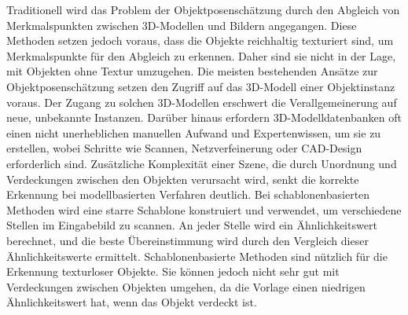 \documentclass[a4paper, 11pt]{article}
\begin{document}
\begin{multicols*}{2}
    Traditionell wird das Problem der Objektposenschätzung durch den Abgleich von Merkmalspunkten zwischen 3D-Modellen und Bildern angegangen. Diese Methoden setzen jedoch voraus, dass die Objekte reichhaltig texturiert sind, um Merkmalspunkte für den Abgleich zu erkennen. Daher sind sie nicht in der Lage, mit Objekten ohne Textur umzugehen. %
    Die meisten bestehenden Ansätze zur Objektposenschätzung setzen den Zugriff auf das 3D-Modell einer Objektinstanz voraus. Der Zugang zu solchen 3D-Modellen erschwert die Verallgemeinerung auf neue, unbekannte Instanzen. %
    Darüber hinaus erfordern 3D-Modelldatenbanken oft einen nicht unerheblichen manuellen Aufwand und Expertenwissen, um sie zu erstellen, wobei Schritte wie Scannen, Netzverfeinerung oder CAD-Design erforderlich sind. Zusätzliche Komplexität einer Szene, die durch Unordnung und Verdeckungen zwischen den Objekten verursacht wird, senkt die korrekte Erkennung bei modellbasierten Verfahren deutlich.
    Bei schablonenbasierten Methoden wird eine starre Schablone konstruiert und verwendet, um verschiedene Stellen im Eingabebild zu scannen. An jeder Stelle wird ein Ähnlichkeitswert berechnet, und die beste Übereinstimmung wird durch den Vergleich dieser Ähnlichkeitswerte ermittelt. Schablonenbasierte Methoden sind nützlich für die Erkennung texturloser Objekte. Sie können jedoch nicht sehr gut mit Verdeckungen zwischen Objekten umgehen, da die Vorlage einen niedrigen Ähnlichkeitswert hat, wenn das Objekt verdeckt ist.

\end{multicols*}
\end{document}
